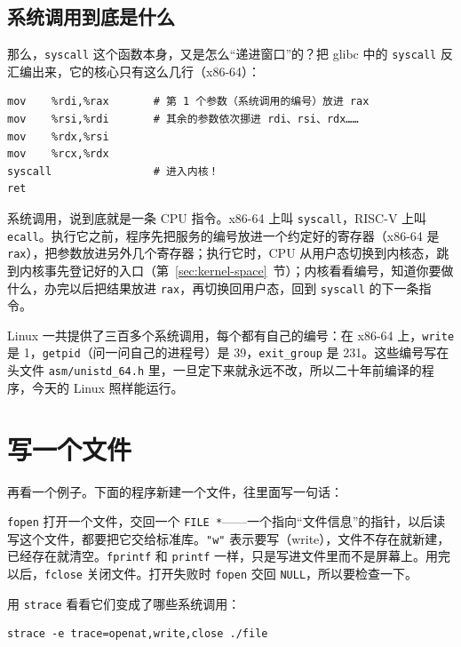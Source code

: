 \subsection{系统调用到底是什么}

那么，\texttt{syscall} 这个函数本身，又是怎么“递进窗口”的？把 glibc 中的 \texttt{syscall} 反汇编出来，它的核心只有这么几行（x86-64）：
\begin{verbatim}
mov    %rdi,%rax       # 第 1 个参数（系统调用的编号）放进 rax
mov    %rsi,%rdi       # 其余的参数依次挪进 rdi、rsi、rdx……
mov    %rdx,%rsi
mov    %rcx,%rdx
syscall                # 进入内核！
ret
\end{verbatim}
系统调用，说到底就是一条 CPU 指令。x86-64 上叫 \texttt{syscall}，RISC-V 上叫 \texttt{ecall}。执行它之前，程序先把服务的编号放进一个约定好的寄存器（x86-64 是 \texttt{rax}），把参数放进另外几个寄存器；执行它时，CPU 从用户态切换到内核态，跳到内核事先登记好的入口（第~\ref{sec:kernel-space}~节）；内核看看编号，知道你要做什么，办完以后把结果放进 \texttt{rax}，再切换回用户态，回到 \texttt{syscall} 的下一条指令。

Linux 一共提供了三百多个系统调用，每个都有自己的编号：在 x86-64 上，\texttt{write} 是 1，\texttt{getpid}（问一问自己的进程号）是 39，\texttt{exit\_group} 是 231。这些编号写在头文件 \texttt{asm/unistd\_64.h} 里，一旦定下来就永远不改，所以二十年前编译的程序，今天的 Linux 照样能运行。

\section{写一个文件}
\label{sec:file}

再看一个例子。下面的程序新建一个文件，往里面写一句话：


\texttt{fopen} 打开一个文件，交回一个 \texttt{FILE *}——一个指向“文件信息”的指针，以后读写这个文件，都要把它交给标准库。\texttt{"w"} 表示要写（write），文件不存在就新建，已经存在就清空。\texttt{fprintf} 和 \texttt{printf} 一样，只是写进文件里而不是屏幕上。用完以后，\texttt{fclose} 关闭文件。打开失败时 \texttt{fopen} 交回 \texttt{NULL}，所以要检查一下。

用 \texttt{strace} 看看它们变成了哪些系统调用：
\begin{verbatim}
strace -e trace=openat,write,close ./file
\end{verbatim}
\inputminted[linenos=false]{text}{code/ch05/out/strace_file.txt}

